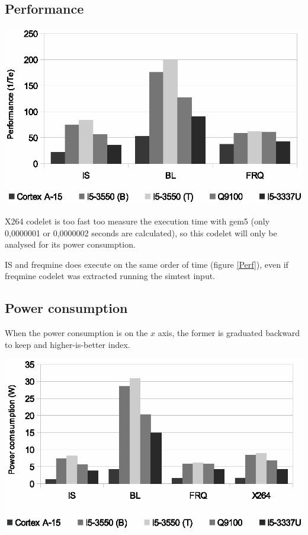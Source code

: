 \documentclass{article}
\newenvironment{Figure}
  {\par\medskip\noindent\center\minipage{0.9\linewidth}}
  {\endminipage\par\bigskip\medskip}
\begin{document}
\begin{multicols}{2}
\subsection{Performance}
\begin{Figure}
\centering
\includegraphics[width=\linewidth]{Performance.eps}
\end{Figure}


X264 codelet is too fast too measure the execution time with gem5 (only 0,0000001 or 0,0000002 seconds are calculated), so this codelet will only be analysed for its power consumption.


IS and freqmine does execute on the same order of time (figure \ref{Perf}), even if freqmine codelet was extracted running the simtest input. 



\subsection{Power consumption}
When the power consumption is on the $x$ axis, the former is graduated backward to keep and higher-is-better index.


\begin{Figure}
\centering
\includegraphics[width=\linewidth]{Power_consumption.eps}
\end{Figure}


\end{multicols}
\end{document}
